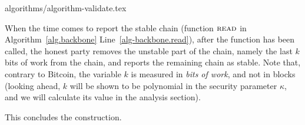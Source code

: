 {algorithms/algorithm-validate.tex}

When the time comes to report the stable chain
(function $\textsc{read}$ in Algorithm~\ref{alg.backbone} Line~\ref{alg-backbone.read}),
after the function \execute has been called,
the honest party removes the unstable part of the chain, namely
the last $k$ bits of work from the chain, and reports
the remaining chain as stable. Note that, contrary to Bitcoin,
the variable $k$ is measured in \emph{bits of work}, and not in blocks
(looking ahead, $k$ will be shown to be polynomial in the
security parameter $\kappa$, and we will calculate its value
in the analysis section).

This concludes the \poem construction.


